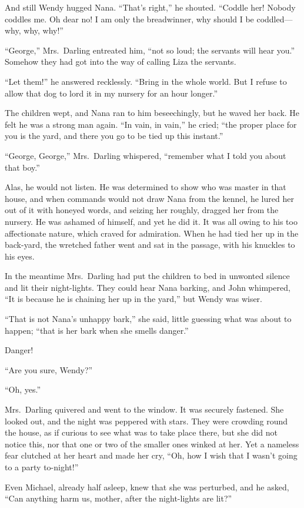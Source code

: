 And still Wendy hugged Nana. ``That's right,'' he shouted. ``Coddle her! Nobody
coddles me. Oh dear no! I am only the breadwinner, why should I be coddled—why,
why, why!''

``George,'' Mrs.\ Darling entreated him, ``not so loud; the servants will hear
you.'' Somehow they had got into the way of calling Liza the servants.

``Let them!'' he answered recklessly. ``Bring in the whole world. But I refuse
to allow that dog to lord it in my nursery for an hour longer.''

The children wept, and Nana ran to him beseechingly, but he waved her back. He
felt he was a strong man again. ``In vain, in vain,'' he cried; ``the proper
place for you is the yard, and there you go to be tied up this instant.''

``George, George,'' Mrs.\ Darling whispered, ``remember what I told you about
that boy.''

Alas, he would not listen. He was determined to show who was master in that
house, and when commands would not draw Nana from the kennel, he lured her out
of it with honeyed words, and seizing her roughly, dragged her from the nursery.
He was ashamed of himself, and yet he did it. It was all owing to his too
affectionate nature, which craved for admiration. When he had tied her up in the
back-yard, the wretched father went and sat in the passage, with his knuckles to
his eyes.

In the meantime Mrs.\ Darling had put the children to bed in unwonted silence
and lit their night-lights. They could hear Nana barking, and John whimpered,
``It is because he is chaining her up in the yard,'' but Wendy was wiser.

``That is not Nana's unhappy bark,'' she said, little guessing what was about to
happen; ``that is her bark when she smells danger.''

Danger!

``Are you sure, Wendy?''

``Oh, yes.''

Mrs.\ Darling quivered and went to the window. It was securely fastened. She
looked out, and the night was peppered with stars. They were crowding round the
house, as if curious to see what was to take place there, but she did not notice
this, nor that one or two of the smaller ones winked at her. Yet a nameless fear
clutched at her heart and made her cry, ``Oh, how I wish that I wasn't going to
a party to-night!''

Even Michael, already half asleep, knew that she was perturbed, and he asked,
``Can anything harm us, mother, after the night-lights are lit?''

